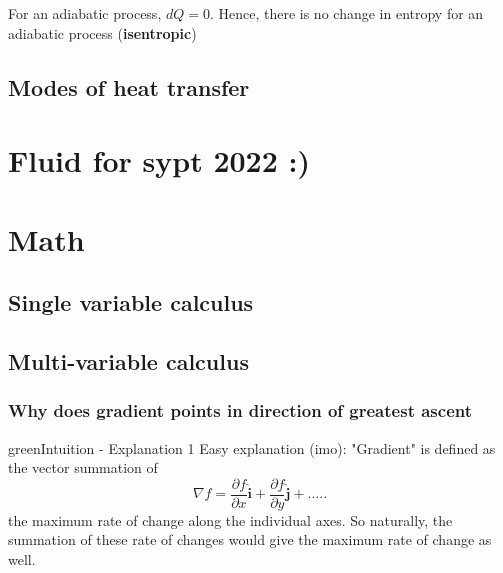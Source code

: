 \documentclass[12pt,a4paper]{extreport}
\numberwithin{equation}{chapter}
\let\oldhat\hat
\renewcommand{\hat}[1]{\oldhat{\mathbf{#1}}}
\begin{document}
    \begin{flushleft}
        For an adiabatic process, $dQ=0$. Hence, there is no change in entropy for an adiabatic process (\textbf{isentropic})
    \end{flushleft}
    \section{Modes of heat transfer}
     
\chapter{Fluid for sypt 2022 :)}

\chapter{Math}
    \section{Single variable calculus}
    \section{Multi-variable calculus}
            \subsection{Why does gradient points in direction of greatest ascent}
            \begin{mybox}{green}{Intuition - Explanation 1}
                Easy explanation (imo): "Gradient" is defined as the vector summation of 
                \begin{equation}
                    \nabla{f}=\frac{\partial f}{\partial x} \hat{i}+\frac{\partial f}{\partial y}\hat{j}+ ..... 
                \end{equation}
                the maximum rate of change along the individual axes. So naturally, the summation of these rate of changes would give the maximum rate of change as well. 
            \end{mybox}
            
\end{document}
